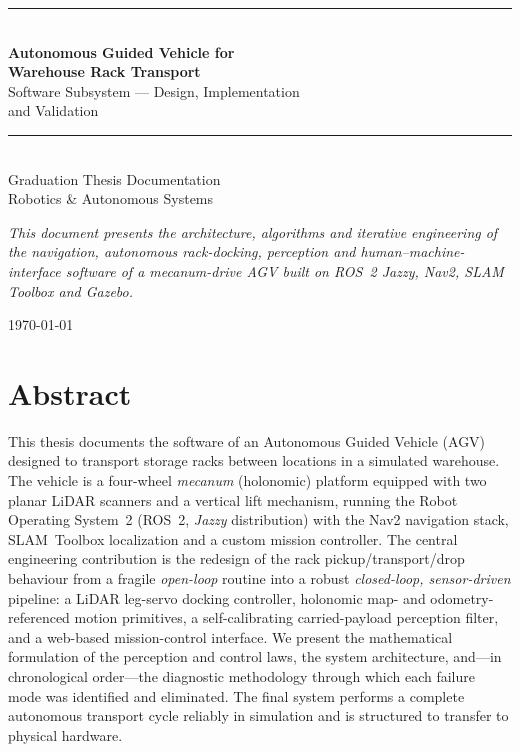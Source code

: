 \documentclass[11pt,a4paper]{article}
\begin{document}
\begin{titlepage}
\centering
\vspace*{2.2cm}
{\color{accent}\rule{\linewidth}{1.4pt}}\\[0.5cm]
{\Huge\bfseries Autonomous Guided Vehicle for\\[0.2cm] Warehouse Rack Transport}\\[0.4cm]
{\LARGE Software Subsystem --- Design, Implementation \\[0.15cm] and Validation}\\[0.3cm]
{\color{accent}\rule{\linewidth}{1.4pt}}\\[1.4cm]
{\large Graduation Thesis Documentation}\\[0.4cm]
{\large Robotics \& Autonomous Systems}\\[2.2cm]
\begin{minipage}{0.85\textwidth}\centering\small
\textit{This document presents the architecture, algorithms and iterative
engineering of the navigation, autonomous rack-docking, perception and
human--machine-interface software of a mecanum-drive AGV built on ROS~2
Jazzy, Nav2, SLAM Toolbox and Gazebo.}
\end{minipage}
\vfill
{\large \today}
\end{titlepage}

\section*{Abstract}
This thesis documents the software of an Autonomous Guided Vehicle (AGV)
designed to transport storage racks between locations in a simulated
warehouse. The vehicle is a four-wheel \emph{mecanum} (holonomic) platform
equipped with two planar LiDAR scanners and a vertical lift mechanism,
running the Robot Operating System~2 (ROS~2, \emph{Jazzy} distribution) with
the Nav2 navigation stack, SLAM~Toolbox localization and a custom mission
controller. The central engineering contribution is the redesign of the
rack pickup/transport/drop behaviour from a fragile \emph{open-loop} routine
into a robust \emph{closed-loop, sensor-driven} pipeline: a LiDAR leg-servo
docking controller, holonomic map- and odometry-referenced motion
primitives, a self-calibrating carried-payload perception filter, and a
web-based mission-control interface. We present the mathematical formulation
of the perception and control laws, the system architecture, and---in
chronological order---the diagnostic methodology through which each failure
mode was identified and eliminated. The final system performs a complete
autonomous transport cycle reliably in simulation and is structured to
transfer to physical hardware.
\end{document}
